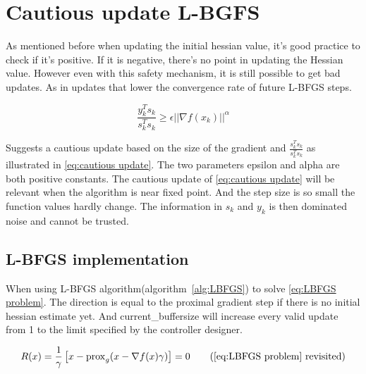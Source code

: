 	\section{Cautious update L-BGFS}
	As mentioned before when updating the initial hessian value, it's good practice to check if it's positive. If it is negative, there's no point in updating the Hessian value. However even with this safety mechanism, it is still possible to get bad updates. As in updates that lower the convergence rate of future L-BFGS steps.
	
	\begin{equation}
		\frac{y_k^Ts_k}{s_k^Ts_k} \ge \epsilon ||\nabla f(x_k)||^\alpha
		\label{eq:cautious update}
	\end{equation}
	
	\cite{Dong-HuiLi1999} Suggests a cautious update based on the size of the gradient and $\frac{s_k^Ts_k}{s_k^Ts_k}$ as illustrated in \eqref{eq:cautious update}. The two parameters epsilon and alpha are both positive constants. The cautious update of \eqref{eq:cautious update} will be relevant when the algorithm is near fixed point. And the step size is so small the function values hardly change. The information in $s_k$ and $y_k$ is then dominated noise and cannot be trusted.
	
	\subsection{L-BFGS implementation}
		When using  L-BFGS algorithm(algorithm~\ref{alg:LBFGS}) to solve \eqref{eq:LBFGS problem}. The direction is equal to the proximal gradient step if there is no initial hessian estimate yet. And current\_buffersize will increase every valid update from 1 to the limit specified by the controller designer.
		
		\begin{equation}
			R(x) = \frac{1}{\gamma}\left[ x - \prox_g( x - \nabla f(x)\gamma) \right] = 0
			\tag{\eqref{eq:LBFGS problem} revisited}
		\end{equation}
		
